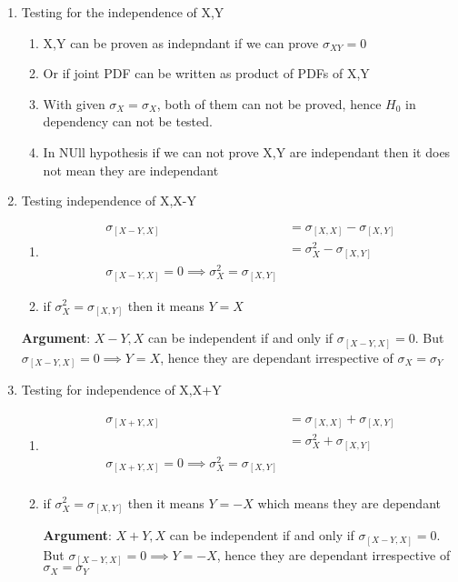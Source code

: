 \documentclass{article}
\begin{document}
\begin{enumerate}
\item \large{Testing for the independence of X,Y}
\begin{enumerate}
\item X,Y can be proven as indepndant if we can prove $\sigma_{XY} = 0$
\item Or if joint PDF can be written as product of PDFs of X,Y
\item With given $\sigma_X = \sigma_X$, both of them can not be proved, hence $H_0$ in dependency can not be tested.
\item In NUll hypothesis if we can not prove X,Y are independant then it does not mean they are independant
\end{enumerate}

\item \large{Testing independence of X,X-Y}
\begin{enumerate}
\item \begin{align*}
    \sigma_{[X-Y,X]} &= \sigma_{[X,X]} - \sigma_{[X,Y]}\\
                     &= \sigma_{X}^2 - \sigma_{[X,Y]}\\
    \sigma_{[X-Y,X]} = 0 \implies \sigma_{X}^2 = \sigma_{[X,Y]}
\end{align*}
\item if $\sigma_{X}^2 = \sigma_{[X,Y]}$ then it means $Y=X$ \\
\end{enumerate}
\begin{tcolorbox}
\large \textbf{Argument}: \small $X-Y, X$ can be independent if and only if  $\sigma_{[X-Y,X]} = 0$. But $\sigma_{[X-Y,X]} = 0 \implies Y=X$, hence they are dependant irrespective of $\sigma_X = \sigma_Y$
\end{tcolorbox}

\item \large Testing for independence of X,X+Y
\begin{enumerate}
\item \begin{align*}
   \sigma_{[X+Y,X]} &= \sigma_{[X,X]} + \sigma_{[X,Y]}\\
                    &= \sigma_{X}^2 + \sigma_{[X,Y]}\\
                    \sigma_{[X+Y,X]} = 0 \implies \sigma_{X}^2 = \sigma_{[X,Y]}\\
\end{align*}
\item if $\sigma_{X}^2 = \sigma_{[X,Y]}$ then it means $Y=-X$ which means they are dependant\\
\begin{tcolorbox}
\large \textbf{Argument}: \small $X+Y, X$ can be independent if and only if  $\sigma_{[X-Y,X]} = 0$. But $\sigma_{[X-Y,X]} = 0 \implies Y=-X$, hence they are dependant irrespective of $\sigma_X = \sigma_Y$
\end{tcolorbox}
\end{enumerate}


\end{enumerate}
\end{document}
